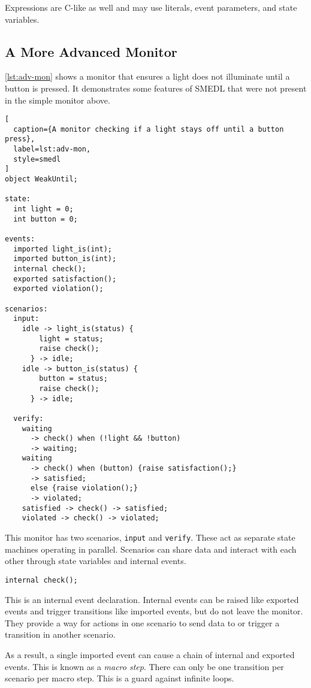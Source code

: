 \documentclass[paper=letter,titlepage,captions=tableheading]{scrartcl}
\begin{document}
Expressions are C-like as well and may use literals, event parameters, and
state variables.

\subsection{A More Advanced Monitor}
\label{subsec:smedl-advanced}

\autoref{lst:adv-mon} shows a monitor that ensures a light does not illuminate
until a button is pressed. It demonstrates some features of SMEDL that were not
present in the simple monitor above.

\begin{lstlisting}[
  caption={A monitor checking if a light stays off until a button press},
  label=lst:adv-mon,
  style=smedl
]
object WeakUntil;

state:
  int light = 0;
  int button = 0;

events:
  imported light_is(int);
  imported button_is(int);
  internal check();
  exported satisfaction();
  exported violation();

scenarios:
  input:
    idle -> light_is(status) {
        light = status;
        raise check();
      } -> idle;
    idle -> button_is(status) {
        button = status;
        raise check();
      } -> idle;

  verify:
    waiting
      -> check() when (!light && !button)
      -> waiting;
    waiting
      -> check() when (button) {raise satisfaction();}
      -> satisfied;
      else {raise violation();}
      -> violated;
    satisfied -> check() -> satisfied;
    violated -> check() -> violated;
\end{lstlisting}

This monitor has two scenarios, \texttt{input} and \texttt{verify}. These act
as separate state machines operating in parallel. Scenarios can share data and
interact with each other through state variables and internal events.

\begin{lstlisting}[firstnumber=10,style=smedlfixed]
  internal check();
\end{lstlisting}

This is an internal event declaration. Internal events can be raised like
exported events and trigger transitions like imported events, but do not leave
the monitor. They provide a way for actions in one scenario to send data to
or trigger a transition in another scenario.

As a result, a single imported event can cause a chain of internal and exported
events. This is known as a \emph{macro step}. There can only be one transition
per scenario per macro step. This is a guard against infinite loops.
\end{document}
